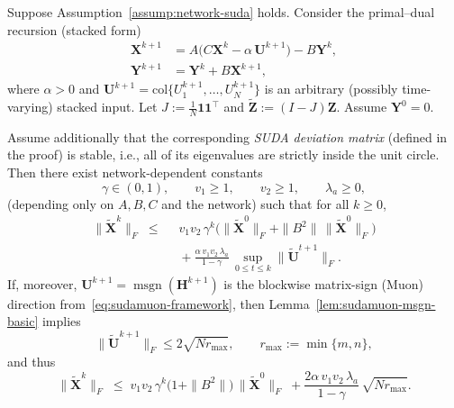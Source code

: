 \documentclass[10pt,a4paper]{amsart}
\begin{document}
\begin{lemma}
\label{lem:sudamuon-suda-consensus-bounded-input}
Suppose Assumption~\ref{assump:network-suda} holds.
Consider the primal--dual recursion (stacked form)
\begin{equation}
\label{eq:sudamuon-suda-backbone-only}
\begin{aligned}
    \mathbf{X}^{k+1} &= A\bigl(C\mathbf{X}^k-\alpha\,\mathbf{U}^{k+1}\bigr)-B\mathbf{Y}^k,\\
    \mathbf{Y}^{k+1} &= \mathbf{Y}^k + B\mathbf{X}^{k+1},
\end{aligned}
\end{equation}
where $\alpha>0$ and $\mathbf{U}^{k+1}=\mathrm{col}\{U_1^{k+1},\ldots,U_N^{k+1}\}$ is an arbitrary (possibly time-varying) stacked input.
Let $J:=\tfrac{1}{N}\mathbf{1}\mathbf{1}^\top$ and $\tilde{\mathbf{Z}}:=(I-J)\mathbf{Z}$.
Assume $\mathbf Y^0=0$.

Assume additionally that the corresponding \emph{SUDA deviation matrix} (defined in the proof) is stable, i.e., all of its eigenvalues are strictly inside the unit circle.
Then there exist network-dependent constants
\[
    \gamma\in(0,1),\qquad v_1\ge 1,\qquad v_2\ge 1,\qquad \lambda_a\ge 0,
\]
(depending only on $A,B,C$ and the network) such that for all $k\ge 0$,
\begin{equation}
\label{eq:sudamuon-suda-consensus-bounded-input}
\begin{split}
\|\tilde{\mathbf{X}}^k\|_F
\;\le\;&\;
 v_1v_2\,\gamma^k\Big(\|\tilde{\mathbf{X}}^0\|_F+\|B^2\|\,\|\tilde{\mathbf{X}}^0\|_F\Big)
\\&\;+
\frac{\alpha\,v_1v_2\,\lambda_a}{1-\gamma}\,\sup_{0\le t\le k}\|\tilde{\mathbf{U}}^{t+1}\|_F.
\end{split}
\end{equation}
If, moreover, $\mathbf{U}^{k+1}=\operatorname{msgn}(\mathbf{H}^{k+1})$ is the blockwise matrix-sign (Muon) direction from~\eqref{eq:sudamuon-framework}, then Lemma~\ref{lem:sudamuon-msgn-basic} implies
\begin{equation}
\label{eq:sudamuon-suda-consensus-bounded-input-bdd}
\|\tilde{\mathbf{U}}^{k+1}\|_F \le 2\sqrt{Nr_{\max}},\qquad r_{\max}:=\min\{m,n\},
\end{equation}
and thus
\[
\|\tilde{\mathbf{X}}^k\|_F
\;\le\;
 v_1v_2\,\gamma^k\bigl(1+\|B^2\|\bigr)\,\|\tilde{\mathbf{X}}^0\|_F
\;+
\frac{2\alpha\,v_1v_2\,\lambda_a}{1-\gamma}\,\sqrt{Nr_{\max}}.
\]
\end{lemma}
\end{document}
